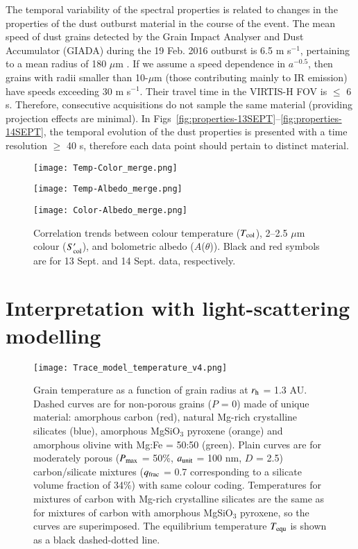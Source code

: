 \documentclass[a4paper,fleqn,usenatbib]{mnras}
\begin{document}
The temporal variability of the spectral properties is related to changes in the properties of the dust outburst material in the course of the event. The mean speed of dust grains detected by the Grain Impact Analyser and Dust Accumulator (GIADA) during the 19 Feb. 2016 outburst is 6.5 m s$^{-1}$, pertaining to a mean radius of 180 $\mu$m \citep{Gruen2016}. If we assume a speed dependence in $a^{-0.5}$, then grains with radii smaller than 10-$\mu$m
(those contributing mainly to IR emission) have speeds exceeding 30 m s$^{-1}$. Their travel time in the VIRTIS-H FOV is $\leq$ 6 s. Therefore, consecutive acquisitions do not sample the same material (providing  projection effects are minimal). In Figs~\ref{fig:properties-13SEPT}--\ref{fig:properties-14SEPT}, the temporal evolution of the dust properties is presented with a time resolution $\geq$ 40 s, therefore each data point should pertain to distinct material.

  \begin{figure}
    \texttt{[image: Temp-Color\_merge.png]}
       \par
\vspace{0.3cm}
    \texttt{[image: Temp-Albedo\_merge.png]}
\par
\vspace{0.3cm}
    \texttt{[image: Color-Albedo\_merge.png]}
     \caption{Correlation trends between colour temperature ($T_{\rm col}$), 2--2.5 $\mu$m colour ($S'_{\rm col}$), and bolometric albedo ($A$($\theta$)). Black and red symbols are for 13 Sept. and 14 Sept. data, respectively. }
    \label{fig:correlation}
\end{figure}

\section{Interpretation with light-scattering modelling}
\label{sec:analysis}

   \begin{figure}
    \texttt{[image: Trace\_model\_temperature\_v4.png]}
\caption{Grain temperature as a function of grain radius at $r_{\rm h}$ = 1.3 AU.
Dashed curves are for non-porous grains ($P$ = 0) made of unique material: amorphous carbon (red),
natural Mg-rich crystalline silicates (blue), amorphous MgSiO$_3$ pyroxene (orange) and amorphous olivine with Mg:Fe = 50:50 (green). Plain curves are for moderately porous ($P_{\rm max}$ = 50\%, $a_{\rm unit}$ = 100 nm, $D$ = 2.5) carbon/silicate mixtures ($q_{\rm frac}$ = 0.7 corresponding to a silicate volume fraction of 34\%) with same colour coding. Temperatures for mixtures of carbon with Mg-rich crystalline silicates are the same as for mixtures of carbon with amorphous MgSiO$_3$ pyroxene, so the curves are superimposed. The equilibrium temperature $T_{\rm equ}$ is shown as a black dashed-dotted line.}
    \label{fig:Tdust}
\end{figure}
\end{document}
